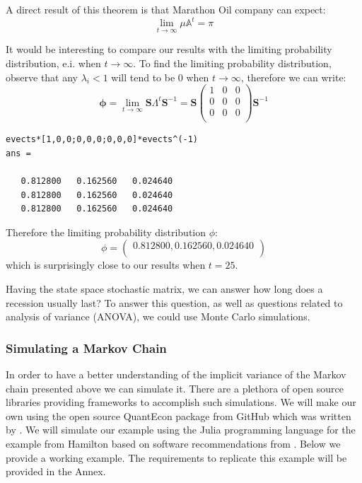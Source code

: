 \documentclass[a4paper,12pt]{article}
\theoremstyle{definition}
\begin{document}
A direct result of this theorem is that Marathon Oil company can expect:
\begin{equation}
\lim_{t \to \infty} \mu \mathbb{A}^t = \pi
\end{equation}


It would be interesting to compare our results with the limiting probability distribution, e.i. when $t \to \infty$.
To find the limiting probability distribution, observe that any $\lambda_i <1$ will tend to be $0$ when $t \to \infty$, therefore we can write:
\begin{equation}
\mathbf{\phi} = \lim_{t \to \infty} \mathbf{S}\Lambda^t\mathbf{S}^{-1} = \mathbf{S} \left(\begin{array}{ccc}
1 &0 &0 \\
0 &0 &0 \\
0 &0 &0 \\
\end{array}\right) \mathbf{S}^{-1}
\end{equation}
\begin{lstlisting}
evects*[1,0,0;0,0,0;0,0,0]*evects^(-1)
ans =

   0.812800   0.162560   0.024640
   0.812800   0.162560   0.024640
   0.812800   0.162560   0.024640
\end{lstlisting}
Therefore the limiting probability distribution $\phi$:
\begin{equation*}
\phi = \left(\begin{array}{c}
0.812800, 0.162560,  0.024640\\
\end{array} \right)
\end{equation*}
which is surprisingly close to our results when $t=25$. 

Having the state space stochastic matrix, we can answer how long does a recession usually last? To answer this question, as well as questions related to analysis of variance (ANOVA), we could use Monte Carlo simulations. 

\subsubsection{Simulating a Markov Chain}\label{sec:SimMC}
In order to have a better understanding of the implicit variance of the Markov chain presented above we can simulate it. 
There are a plethora of open source libraries providing frameworks to accomplish such simulations. We will make our own using the open source QuantEcon package from GitHub which was written by \cite{quantecon}. We will simulate our example using the Julia programming language for the example from Hamilton based on software recommendations from \cite{quantecon}. Below we provide a working example. The requirements to replicate this example will be provided in the Annex. 
\end{document}
